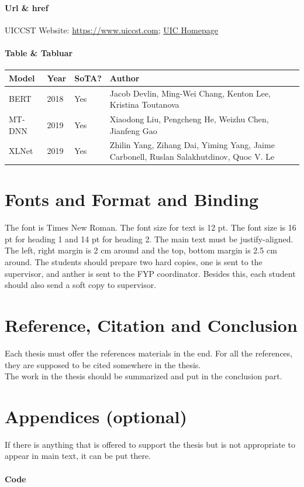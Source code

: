\documentclass[12pt]{article}
\begin{document}
\paragraph{Url \& href} UICCST Website: \url{https://www.uiccst.com}; \href{https://www.uic.edu.hk}{UIC Homepage}
\paragraph{Table \& Tabluar}\mbox{}
\begin{table}[H]
    \begin{tabu} to 
        \hline
        Model & Year & SoTA? & Author \\ \hline
        BERT & 2018 & Yes & Jacob Devlin, Ming-Wei Chang, Kenton Lee, Kristina Toutanova \\ \hline
        MT-DNN & 2019 & Yes & Xiaodong Liu, Pengcheng He, Weizhu Chen, Jianfeng Gao \\ \hline
        XLNet & 2019 & Yes & Zhilin Yang, Zihang Dai, Yiming Yang, Jaime Carbonell, Ruslan Salakhutdinov, Quoc V. Le \\
        \hline
    \end{tabu}
\end{table}

\section{Fonts and Format and Binding}
The font is Times New Roman. The font size for text is 12 pt. The font size is 16 pt for heading 1 and 14 pt for heading 2. The main text must be justify-aligned. The left, right margin is 2 cm around and the top, bottom margin is 2.5 cm around. The students should prepare two hard copies, one is sent to the supervisor, and anther is sent to the FYP coordinator. Besides this, each student should also send a soft copy to supervisor.\cite{Gusfield:97}\par

\section{Reference, Citation and Conclusion}
Each thesis must offer the references materials in the end. For all the references, they are supposed to be cited somewhere in the thesis.\\
The work in the thesis should be summarized and put in the conclusion part.\cite{APA:83}




\section*{Appendices (optional)}
If there is anything that is offered to support the thesis but is not appropriate to appear in main text, it can be put there.

\paragraph{Code}\mbox{}

\end{document}

